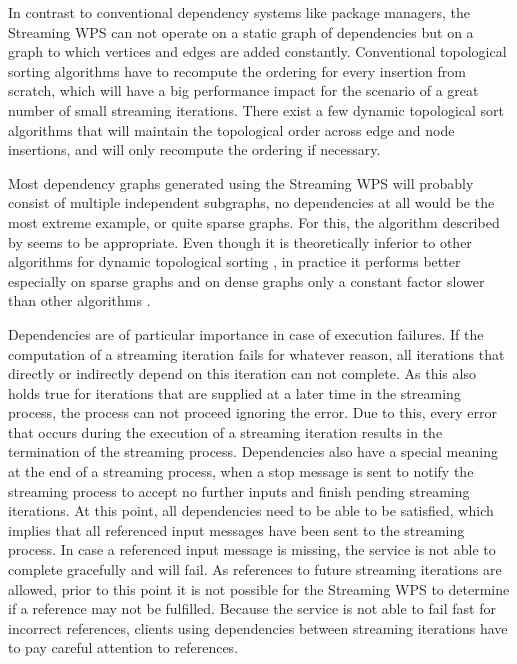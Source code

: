     In contrast to conventional dependency systems like package managers, the Streaming \ac{WPS} can not operate on a static graph of dependencies but on a graph to which vertices and edges are added constantly. Conventional topological sorting algorithms have to recompute the ordering for every insertion from scratch, which will have a big performance impact for the scenario of a great number of small streaming iterations. There exist a few dynamic topological sort algorithms that will maintain the topological order across edge and node insertions, and will only recompute the ordering if necessary.

    Most dependency graphs generated using the Streaming \ac{WPS} will probably consist of multiple independent subgraphs, no dependencies at all would be the most extreme example, or quite sparse graphs. For this, the algorithm described by \citet{pearce2007dynamic} seems to be appropriate. Even though it is theoretically inferior to other algorithms for dynamic topological sorting \citep[e.g. ][]{alpern1990incremental,marchetti1996maintaining}, in practice it performs better especially on sparse graphs and on dense graphs only a constant factor slower than other algorithms \citep{pearce2007dynamic}.

    Dependencies are of particular importance in case of execution failures. If the computation of a streaming iteration fails for whatever reason, all iterations that directly or indirectly depend on this iteration can not complete. As this also holds true for iterations that are supplied at a later time in the streaming process, the process can not proceed ignoring the error. Due to this, every error that occurs during the execution of a streaming iteration results in the termination of the streaming process.
    Dependencies also have a special meaning at the end of a streaming process, when a stop message is sent to notify the streaming process to accept no further inputs and finish pending streaming iterations. At this point, all dependencies need to be able to be satisfied, which implies that all referenced input messages have been sent to the streaming process. In case a referenced input message is missing, the service is not able to complete gracefully and will fail. As references to future streaming iterations are allowed, prior to this point it is not possible for the Streaming \ac{WPS} to determine if a reference may not be fulfilled. Because the service is not able to fail fast for incorrect references, clients using dependencies between streaming iterations have to pay careful attention to references.

